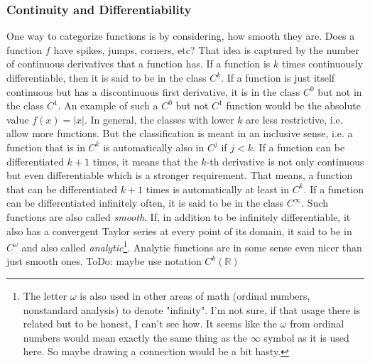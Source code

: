 \subsubsection{Continuity and Differentiability}
One way to categorize functions is by considering, how smooth they are. Does a function $f$ have spikes, jumps, corners, etc? That idea is captured by the number of continuous derivatives that a function has. If a function is $k$ times continuously differentiable, then it is said to be in the class $C^k$. If a function is just itself continuous but has a discontinuous first derivative, it is in the class $C^0$ but not in the class $C^1$. An example of such a $C^0$ but not $C^1$ function would be the absolute value $f(x) = |x|$. In general, the classes with lower $k$ are less restrictive, i.e. allow more functions. But the classification is meant in an inclusive sense, i.e. a function that is in $C^k$ is automatically also in $C^j$ if $j < k$. If a function can be differentiated $k+1$ times, it means that the $k$-th derivative is not only continuous but even differentiable which is a stronger requirement. That means, a function that can be differentiated $k+1$ times is automatically at least in $C^k$. If a function can be differentiated infinitely often, it is said to be in the class $C^\infty$. Such functions are also called \emph{smooth}. If, in addition to be infinitely differentiable, it also has a convergent Taylor series at every point of its domain, it said to be in $C^\omega$ and also called \emph{analytic}\footnote{The letter $\omega$ is also used in other areas of math (ordinal numbers, nonstandard analysis) to denote "infinity". I'm not sure, if that usage there is related but to be honest, I can't see how. It seems like the $\omega$ from ordinal numbers would mean exactly the same thing as the $\infty$ symbol as it is used here. So maybe drawing a connection would be a bit hasty.}. Analytic functions are in some sense even nicer than just smooth ones.
ToDo: maybe use notation $C^k(\mathbb{R})$





